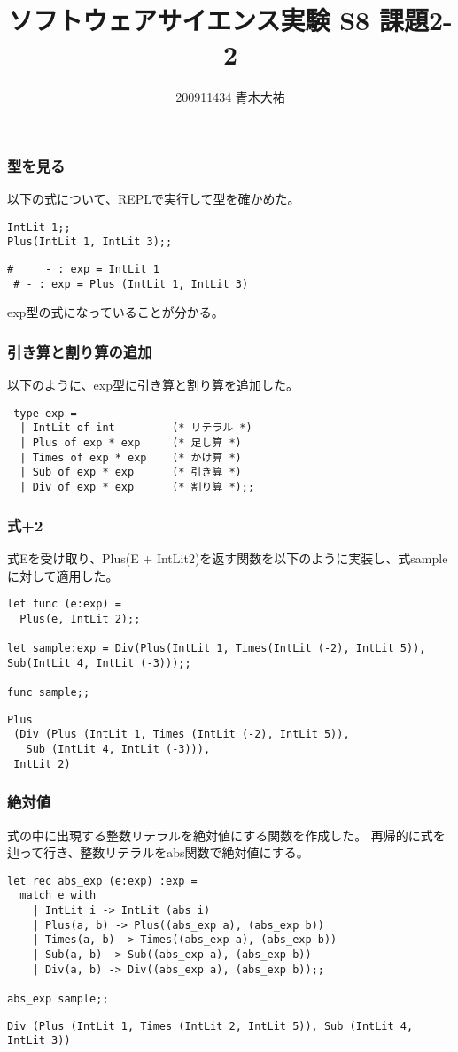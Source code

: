 \documentclass[a4paper,9pt]{jarticle}
\title{ソフトウェアサイエンス実験 S8 課題2-2}
\author{200911434 青木大祐}
\begin{document}
\maketitle
\setcounter{section}{2}
\setcounter{subsection}{2}

\newpage

\subsubsection{型を見る}
以下の式について、REPLで実行して型を確かめた。
\begin{lstlisting}
IntLit 1;;
Plus(IntLit 1, IntLit 3);;
\end{lstlisting}

\begin{lstlisting}[caption=実行結果]
 #     - : exp = IntLit 1
 # - : exp = Plus (IntLit 1, IntLit 3)
\end{lstlisting}
exp型の式になっていることが分かる。

\subsubsection{引き算と割り算の追加}
以下のように、exp型に引き算と割り算を追加した。
\begin{lstlisting}
 type exp =
  | IntLit of int         (* リテラル *)
  | Plus of exp * exp     (* 足し算 *)
  | Times of exp * exp    (* かけ算 *)
  | Sub of exp * exp      (* 引き算 *)
  | Div of exp * exp      (* 割り算 *);;
\end{lstlisting}

\subsubsection{式+2}
式Eを受け取り、Plus(E + IntLit2)を返す関数を以下のように実装し、式sample
に対して適用した。
\begin{lstlisting}
let func (e:exp) =
  Plus(e, IntLit 2);;

let sample:exp = Div(Plus(IntLit 1, Times(IntLit (-2), IntLit 5)), Sub(IntLit 4, IntLit (-3)));;

func sample;;
\end{lstlisting}

\begin{lstlisting}[caption=実行結果]
 Plus
 (Div (Plus (IntLit 1, Times (IntLit (-2), IntLit 5)),
   Sub (IntLit 4, IntLit (-3))),
 IntLit 2)
\end{lstlisting}

\subsubsection{絶対値}
式の中に出現する整数リテラルを絶対値にする関数を作成した。 再帰的に式を辿って行き、整数リテラルをabs関数で絶対値にする。
\begin{lstlisting}
let rec abs_exp (e:exp) :exp = 
  match e with
    | IntLit i -> IntLit (abs i)
    | Plus(a, b) -> Plus((abs_exp a), (abs_exp b))
    | Times(a, b) -> Times((abs_exp a), (abs_exp b))
    | Sub(a, b) -> Sub((abs_exp a), (abs_exp b))
    | Div(a, b) -> Div((abs_exp a), (abs_exp b));;

abs_exp sample;;
\end{lstlisting}

\begin{lstlisting}[caption=実行結果]
   Div (Plus (IntLit 1, Times (IntLit 2, IntLit 5)), Sub (IntLit 4, IntLit 3)) 
\end{lstlisting}
\end{document}
